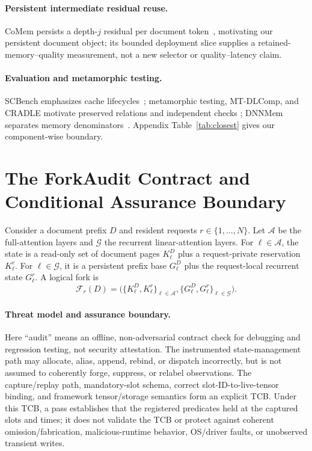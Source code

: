 \documentclass{article}
\begin{document}
\paragraph{Persistent intermediate residual reuse.}
CoMem persists a depth-$j$ residual per document token~\citep{liu2026comem,
liu2026understanding}, motivating our persistent document object; its bounded
deployment slice supplies a retained-memory--quality measurement, not a new
selector or quality--latency claim.

\paragraph{Evaluation and metamorphic testing.}
SCBench emphasizes cache lifecycles~\citep{li2025scbench}; metamorphic testing,
MT-DLComp, and CRADLE motivate preserved relations and independent checks
\citep{chen2018metamorphic,xiao2022metamorphic,pham2019cradle}; DNNMem separates
memory denominators~\citep{gao2020dnnmem}.  Appendix Table~\ref{tab:closest}
gives our component-wise boundary.

\section{The ForkAudit Contract and Conditional Assurance Boundary}
\label{sec:contract}

Consider a document prefix $D$ and resident requests
$r\in\{1,\ldots,N\}$.  Let $\mathcal{A}$ be the full-attention layers and
$\mathcal{G}$ the recurrent linear-attention layers.  For
$\ell\in\mathcal{A}$, the state is a read-only set of document pages
$K^D_\ell$ plus a request-private reservation $K^r_\ell$.  For
$\ell\in\mathcal{G}$, it is a persistent prefix base $G^D_\ell$ plus the
request-local recurrent state $G^r_\ell$.  A logical fork is
\begin{equation}
  \mathcal{F}_r(D) =
  \bigl(\{K^D_\ell,K^r_\ell\}_{\ell\in\mathcal{A}},
        \{G^D_\ell,G^r_\ell\}_{\ell\in\mathcal{G}}\bigr).
\end{equation}

\paragraph{Threat model and assurance boundary.}
Here ``audit'' means an offline, non-adversarial contract check for debugging
and regression testing, not security attestation.  The instrumented
state-management path may allocate, alias, append, rebind, or dispatch
incorrectly, but is not assumed to coherently forge, suppress, or relabel
observations.  The capture/replay path, mandatory-slot schema, correct
slot-ID-to-live-tensor binding, and framework tensor/storage semantics form an
explicit TCB.  Under this TCB, a pass establishes that the registered
predicates held at the captured slots and times; it does not validate the TCB
or protect against coherent omission/fabrication, malicious-runtime behavior,
OS/driver faults, or unobserved transient writes.
\end{document}
